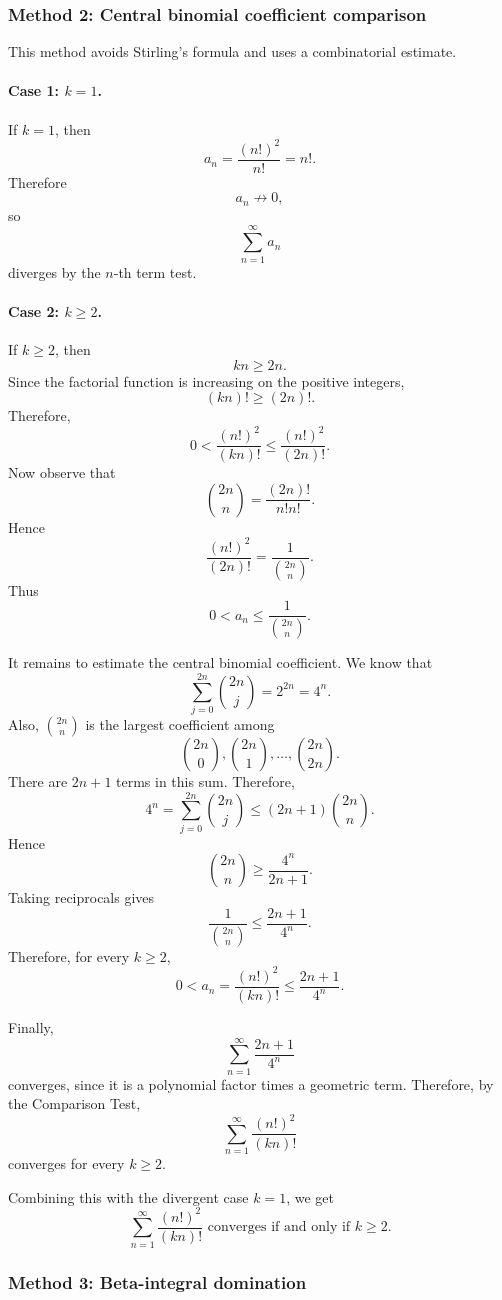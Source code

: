 \documentclass[12pt]{article}
\begin{document}
\newpage
\subsubsection*{Method 2: Central binomial coefficient comparison}

This method avoids Stirling's formula and uses a combinatorial estimate.

\paragraph{Case 1: \(k=1\).}
If \(k=1\), then
\[
a_n=\frac{(n!)^2}{n!}=n!.
\]
Therefore
\[
a_n\not\to 0,
\]
so
\[
\sum_{n=1}^{\infty}a_n
\]
diverges by the \(n\)-th term test.

\paragraph{Case 2: \(k\ge 2\).}
If \(k\ge 2\), then
\[
kn\ge 2n.
\]
Since the factorial function is increasing on the positive integers,
\[
(kn)!\ge (2n)!.
\]
Therefore,
\[
0<
\frac{(n!)^2}{(kn)!}
\le
\frac{(n!)^2}{(2n)!}.
\]
Now observe that
\[
\binom{2n}{n}
=
\frac{(2n)!}{n!n!}.
\]
Hence
\[
\frac{(n!)^2}{(2n)!}
=
\frac{1}{\binom{2n}{n}}.
\]
Thus
\[
0<
a_n
\le
\frac{1}{\binom{2n}{n}}.
\]

It remains to estimate the central binomial coefficient. We know that
\[
\sum_{j=0}^{2n}\binom{2n}{j}
=
2^{2n}
=
4^n.
\]
Also, \(\binom{2n}{n}\) is the largest coefficient among
\[
\binom{2n}{0},\binom{2n}{1},\ldots,\binom{2n}{2n}.
\]
There are \(2n+1\) terms in this sum. Therefore,
\[
4^n
=
\sum_{j=0}^{2n}\binom{2n}{j}
\le
(2n+1)\binom{2n}{n}.
\]
Hence
\[
\binom{2n}{n}
\ge
\frac{4^n}{2n+1}.
\]
Taking reciprocals gives
\[
\frac{1}{\binom{2n}{n}}
\le
\frac{2n+1}{4^n}.
\]
Therefore, for every \(k\ge 2\),
\[
0<
a_n
=
\frac{(n!)^2}{(kn)!}
\le
\frac{2n+1}{4^n}.
\]

Finally,
\[
\sum_{n=1}^{\infty}\frac{2n+1}{4^n}
\]
converges, since it is a polynomial factor times a geometric term. Therefore, by the Comparison Test,
\[
\sum_{n=1}^{\infty}\frac{(n!)^2}{(kn)!}
\]
converges for every \(k\ge 2\).

Combining this with the divergent case \(k=1\), we get
\[
\boxed{\sum_{n=1}^{\infty}\frac{(n!)^2}{(kn)!}
\text{ converges if and only if }k\ge 2.}
\]

\newpage
\subsubsection*{Method 3: Beta-integral domination}
\end{document}
